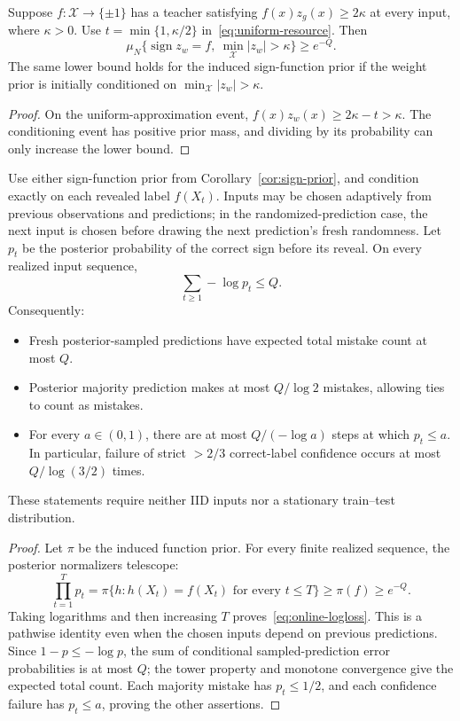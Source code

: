 \begin{corollary}\label{cor:sign-prior}
Suppose $f:\mathcal X\to\{\pm1\}$ has a teacher satisfying
$f(x)z_g(x)\ge2\kappa$ at every input, where $\kappa>0$.
Use $t=\min\{1,\kappa/2\}$ in~\eqref{eq:uniform-resource}. Then
\[
 \mu_N\{\operatorname{sign}z_w=f,\ \min_{\mathcal X}|z_w|>\kappa\}
 \ge e^{-Q}.
\]
The same lower bound holds for the induced sign-function prior if the weight prior is initially conditioned on $\min_{\mathcal X}|z_w|>\kappa$.
\end{corollary}
\begin{proof}
On the uniform-approximation event, $f(x)z_w(x)\ge2\kappa-t>\kappa$. The conditioning event has positive prior mass, and dividing by its probability can only increase the lower bound.
\end{proof}

\begin{corollary}\label{cor:online-mistakes}
Use either sign-function prior from Corollary~\ref{cor:sign-prior}, and condition exactly on each revealed label $f(X_t)$. Inputs may be chosen adaptively from previous observations and predictions; in the randomized-prediction case, the next input is chosen before drawing the next prediction's fresh randomness. Let $p_t$ be the posterior probability of the correct sign before its reveal. On every realized input sequence,
\begin{equation}
 \sum_{t\ge1}-\log p_t\le Q.
 \label{eq:online-logloss}
\end{equation}
Consequently:
\begin{itemize}
\item Fresh posterior-sampled predictions have expected total mistake count at most $Q$.
\item Posterior majority prediction makes at most $Q/\log2$ mistakes, allowing ties to count as mistakes.
\item For every $a\in(0,1)$, there are at most $Q/(-\log a)$ steps at which $p_t\le a$. In particular, failure of strict $>2/3$ correct-label confidence occurs at most $Q/\log(3/2)$ times.
\end{itemize}
These statements require neither IID inputs nor a stationary train--test distribution.
\end{corollary}
\begin{proof}
Let $\pi$ be the induced function prior. For every finite realized sequence, the posterior normalizers telescope:
\[
 \prod_{t=1}^T p_t
 =\pi\{h:h(X_t)=f(X_t)\text{ for every }t\le T\}
 \ge\pi(f)\ge e^{-Q}.
\]
Taking logarithms and then increasing $T$ proves~\eqref{eq:online-logloss}. This is a pathwise identity even when the chosen inputs depend on previous predictions. Since $1-p\le-\log p$, the sum of conditional sampled-prediction error probabilities is at most $Q$; the tower property and monotone convergence give the expected total count. Each majority mistake has $p_t\le1/2$, and each confidence failure has $p_t\le a$, proving the other assertions.
\end{proof}

